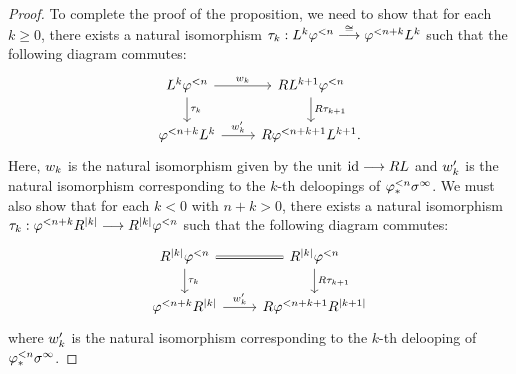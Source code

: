 \begin{proof}
To complete the proof of the proposition, we need to show that
for each $k \geq 0$, there exists a natural isomorphism $\tau_k : 
L^k\varphi^{< n} \stackrel{\cong}{\longrightarrow} \varphi^{< n + k}L^k$
such that the following diagram commutes:
\begin{equation}\label{eq_prop_spectHI_commute_1}
\begin{tikzcd}
L^k\tlHI{n} \arrow{r}{\deloop_k} \arrow{d}{\tau_{k}} &
RL^{k + 1} \tlHI{n} \arrow{d}{R\tau_{k + 1}} \\
\tlHI{n + k}L^k \arrow{r}{\deloop_k'} &
R\tlHI{n + k + 1}L^{k + 1}.
\end{tikzcd}
\end{equation}
Here, $w_k$ is the natural isomorphism given by the unit 
$\mathrm{id} \longrightarrow RL$ and $w_k'$ is the natural isomorphism 
corresponding to the $k$-th deloopings of $\varphi^{< n}_{*}\sigma^\infty$.
We must also show that for each $k < 0$ with $n + k > 0$, there 
exists a natural isomorphism $\tau_k : \varphi^{< n + k}R^{|k|} \longrightarrow 
R^{|k|}\varphi^{< n}$ such that the following diagram commutes:
\begin{equation}\label{eq_prop_spectHI_commute_2}
\begin{tikzcd}
R^{|k|}\tlHI{n} \arrow[equals]{r} \arrow{d}{\tau_{k}} & 
R^{|k|}\tlHI{n} \arrow{d}{R\tau_{k + 1}}\\
\tlHI{n + k}R^{|k|} \arrow{r}{\deloop_k'}&
R\tlHI{n + k + 1}R^{|k + 1|} 
\end{tikzcd}
\end{equation}
where $w_k'$ is the natural isomorphism corresponding to the 
$k$-th delooping of $\varphi^{< n}_{*}\sigma^\infty$. 


\end{proof}
